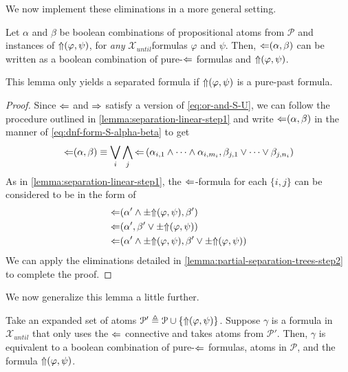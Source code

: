 \documentclass[a4paper,UKenglish,cleveref, autoref, thm-restate, numberwithinsect]{lipics-v2021}
\def\Larrow{\ensuremath\mathord{\Leftarrow}}
\def\Rarrow{\ensuremath\mathord{\Rightarrow}}
\def\Uarrow{\ensuremath\mathord{\Uparrow}}
\begin{document}
We now implement these eliminations in a more general setting.
\begin{lemma}
    \label{lemma:partial-separation-trees-step3}
    Let $\alpha$ and $\beta$ be boolean combinations of propositional atoms from $\mathcal{P}$ and instances of $\Uarrow(\varphi, \psi)$, for \emph{any} $\mathcal{X}_{until} $formulas $\varphi$ and $\psi$. Then, $\Larrow(\alpha, \beta)$ can be written as a boolean combination of pure-$\Larrow$ formulas and $\Uarrow(\varphi, \psi)$.
    \begin{remark*}
        This lemma only yields a separated formula if $\Uarrow(\varphi, \psi)$ is a pure-past formula.
    \end{remark*}
\end{lemma}
\begin{proof}
    Since $\Larrow$ and $\Rarrow$ satisfy a version of \cref{eq:or-and-S-U}, we can follow the procedure outlined in \cref{lemma:separation-linear-step1} and write $\Larrow(\alpha, \beta)$ in the manner of \cref{eq:dnf-form-S-alpha-beta} to get
    \begin{equation*}
        \Larrow(\alpha, \beta) \equiv \bigvee_i \bigwedge_j \Larrow\left(\alpha_{i, 1} \land \cdots \land \alpha_{i, m_i}, \beta_{j, 1} \lor \cdots \lor \beta_{j, n_i} \right)
    \end{equation*}
    As in \cref{lemma:separation-linear-step1}, the $\Larrow$-formula for each $\{i, j\}$ can be considered to be in the form of
    \begin{equation*}
        \begin{aligned}
            &\Larrow(\alpha' \land \pm \Uarrow(\varphi, \psi), \beta')\\
            &\Larrow(\alpha', \beta' \lor \pm \Uarrow(\varphi, \psi))\\
            &\Larrow(\alpha' \land \pm \Uarrow(\varphi, \psi), \beta' \lor \pm \Uarrow(\varphi, \psi))\\
        \end{aligned}
    \end{equation*}
    We can apply the eliminations detailed in \cref{lemma:partial-separation-trees-step2} to complete the proof.
\end{proof}
We now generalize this lemma a little further.
\begin{lemma}
    \label{lemma:partial-separation-trees-step4}
    Take an expanded set of atoms $\mathcal{P}' \triangleq \mathcal{P} \cup \{\Uarrow(\varphi, \psi)\}$. Suppose $\gamma$ is a formula in $\mathcal{X}_{until}$ that only uses the $\Larrow$ connective and takes atoms from $\mathcal{P}'$. Then, $\gamma$ is equivalent to a boolean combination of pure-$\Larrow$ formulas, atoms in $\mathcal{P}$, and the formula $\Uarrow(\varphi, \psi)$.
\end{lemma}
\end{document}
